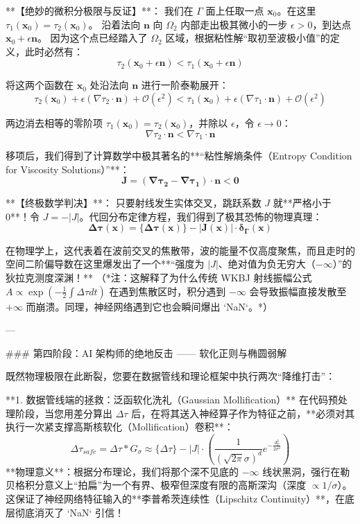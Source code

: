 \documentclass[12pt]{article}
\begin{document}
{**【绝妙的微积分极限与反证】**：
我们在 $\Gamma$ 面上任取一点 $\mathbf{x}_0$。在这里 $\tau_1(\mathbf{x}_0) = \tau_2(\mathbf{x}_0)$。
沿着法向 $\mathbf{n}$ 向 $\Omega_2$ 内部走出极其微小的一步 $\epsilon > 0$，到达点 $\mathbf{x}_0 + \epsilon \mathbf{n}$。
因为这个点已经踏入了 $\Omega_2$ 区域，根据粘性解“取初至波极小值”的定义，此时必然有：
$$ \tau_2(\mathbf{x}_0 + \epsilon \mathbf{n}) < \tau_1(\mathbf{x}_0 + \epsilon \mathbf{n}) $$

将这两个函数在 $\mathbf{x}_0$ 处沿法向 $\mathbf{n}$ 进行一阶泰勒展开：
$$ \tau_2(\mathbf{x}_0) + \epsilon (\nabla \tau_2 \cdot \mathbf{n}) + \mathcal{O}(\epsilon^2) < \tau_1(\mathbf{x}_0) + \epsilon (\nabla \tau_1 \cdot \mathbf{n}) + \mathcal{O}(\epsilon^2) $$

两边消去相等的零阶项 $\tau_1(\mathbf{x}_0) = \tau_2(\mathbf{x}_0)$，并除以 $\epsilon$，令 $\epsilon \to 0$：
$$ \nabla \tau_2 \cdot \mathbf{n} < \nabla \tau_1 \cdot \mathbf{n} $$

移项后，我们得到了计算数学中极其著名的**“粘性解熵条件（Entropy Condition for Viscosity Solutions）”**：
$$ \mathbf{J = (\nabla \tau_2 - \nabla \tau_1) \cdot \mathbf{n} < 0} $$

**【终极数学判决】**：
只要射线发生实体交叉，跳跃系数 $J$ 就**严格小于 0**！令 $J = -|J|$。代回分布定律方程，我们得到了极其恐怖的物理真理：
$$ \mathbf{\Delta \tau(\mathbf{x}) = \{\Delta \tau(\mathbf{x})\} - |J(\mathbf{x})| \cdot \delta_{\Gamma}(\mathbf{x})} $$

在物理学上，这代表着在波前交叉的焦散带，波的能量不仅高度聚焦，而且走时的空间二阶偏导数在这里爆发出了一个**“强度为 $|J|$、绝对值为负无穷大（$-\infty$）”的狄拉克测度深渊！**
（*注：这解释了为什么传统 WKBJ 射线振幅公式 $A \propto \exp(-\frac{1}{2}\int \Delta \tau dt)$ 在遇到焦散区时，积分遇到 $-\infty$ 会导致振幅直接发散至 $+\infty$ 而崩溃。同理，神经网络遇到它也会瞬间爆出 `NaN`。*）

---

### 第四阶段：AI 架构师的绝地反击 —— 软化正则与椭圆弱解

既然物理极限在此断裂，您要在数据管线和理论框架中执行两次“降维打击”：

**1. 数据管线端的拯救：泛函软化洗礼（Gaussian Mollification）**
在代码预处理阶段，当您用差分算出 $\Delta \tau$ 后，在将其送入神经算子作为特征之前，**必须对其执行一次紧支撑高斯核软化（Mollification）卷积**：
$$ \Delta \tau_{safe} = \Delta \tau * G_\sigma \approx \{\Delta \tau\} - |J| \cdot \left( \frac{1}{(\sqrt{2\pi}\sigma)^d} e^{-\frac{d_{\Gamma}^2}{2\sigma^2}} \right) $$
**物理意义**：根据分布理论，我们将那个深不见底的 $-\infty$ 线状黑洞，强行在勒贝格积分意义上“拍扁”为一个有界、极窄但深度有限的高斯深沟（深度 $\propto 1/\sigma$）。这保证了神经网络特征输入的**李普希茨连续性（Lipschitz Continuity）**，在底层彻底消灭了 `NaN` 引信！

}
\end{document}
